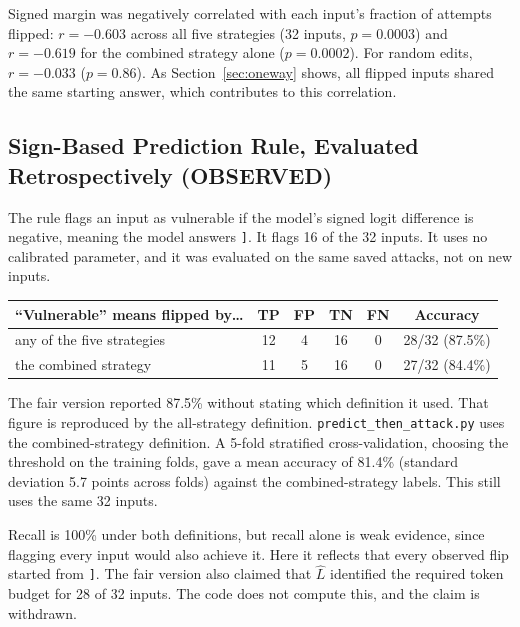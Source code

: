 \documentclass[11pt]{article}
\newcommand{\lab}[1]{{\footnotesize\MakeUppercase{#1}}}
\newcommand{\observed}{\lab{observed}}
\newcommand{\rb}{\texttt{]}}
\newcommand{\Lhat}{\hat{L}}
\begin{document}
Signed margin was negatively correlated with each input's fraction of attempts flipped: $r = -0.603$ across all five strategies (32 inputs, $p = 0.0003$) and $r = -0.619$ for the combined strategy alone ($p = 0.0002$). For random edits, $r = -0.033$ ($p = 0.86$). As Section~\ref{sec:oneway} shows, all flipped inputs shared the same starting answer, which contributes to this correlation.

\subsection{Sign-Based Prediction Rule, Evaluated Retrospectively (\observed)}\label{sec:rule}
The rule flags an input as vulnerable if the model's signed logit difference is negative, meaning the model answers \rb{}. It flags 16 of the 32 inputs. It uses no calibrated parameter, and it was evaluated on the same saved attacks, not on new inputs.
\begin{center}
\small
\begin{tabular}{@{}lccccc@{}}
\toprule
``Vulnerable'' means flipped by\ldots & TP & FP & TN & FN & Accuracy \\
\midrule
any of the five strategies & 12 & 4 & 16 & 0 & 28/32 (87.5\%) \\
the combined strategy & 11 & 5 & 16 & 0 & 27/32 (84.4\%) \\
\bottomrule
\end{tabular}
\end{center}
The fair version reported 87.5\% without stating which definition it used. That figure is reproduced by the all-strategy definition. \texttt{predict\_then\_attack.py} uses the combined-strategy definition. A 5-fold stratified cross-validation, choosing the threshold on the training folds, gave a mean accuracy of 81.4\% (standard deviation 5.7 points across folds) against the combined-strategy labels. This still uses the same 32 inputs.

Recall is 100\% under both definitions, but recall alone is weak evidence, since flagging every input would also achieve it. Here it reflects that every observed flip started from \rb{}. The fair version also claimed that $\Lhat$ identified the required token budget for 28 of 32 inputs. The code does not compute this, and the claim is withdrawn.
\end{document}
